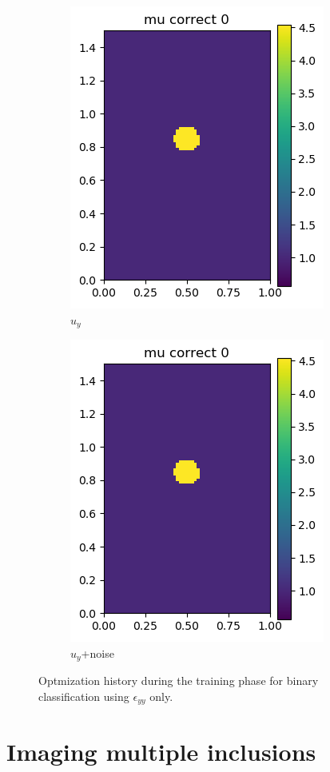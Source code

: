 \documentclass[12pt]{article}
\newcommand{\nhgscalefactor}{0.22}
\newcommand{\nhgfigheight}{3.8cm}
\begin{document}
\begin{figure}
\begin{subfigure}[b]{\nhgscalefactor\linewidth}
     \includegraphics[totalheight=\nhgfigheight]{Figures/strain/ex1/mucomp00.png}
     \caption{$u_y$}
   \end{subfigure}
   \begin{subfigure}[b]{\nhgscalefactor\linewidth}
     \includegraphics[totalheight=\nhgfigheight]{Figures/strain/ex1/mucomp00.png}
     \caption{$u_y$+noise}
   \end{subfigure}
  \caption{\label{app:eyy:curves} Optmization history during the training phase for binary classification using $\epsilon_{yy}$ only.}
\end{figure}
\clearpage
\newpage
%
\section{Imaging multiple inclusions}
%
%
\end{document}
